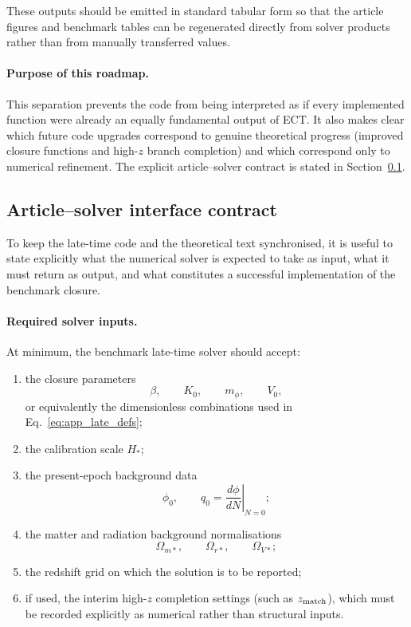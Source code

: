 \documentclass[11pt,a4paper]{article}
\numberwithin{equation}{section}
\begin{document}
These outputs should be emitted in standard tabular form so that the
article figures and benchmark tables can be regenerated directly from
solver products rather than from manually transferred values.

\paragraph{Purpose of this roadmap.}
This separation prevents the code from being interpreted as if every
implemented function were already an equally fundamental output of ECT.
It also makes clear which future code upgrades correspond to genuine
theoretical progress (improved closure functions and high-$z$ branch
completion) and which correspond only to numerical refinement.
The explicit article--solver contract is stated in
Section~\ref{sec:late_cosmo_interface}.

\subsection{Article--solver interface contract}
\label{sec:late_cosmo_interface}

To keep the late-time code and the theoretical text synchronised, it is
useful to state explicitly what the numerical solver is expected to take
as input, what it must return as output, and what constitutes a
successful implementation of the benchmark closure.

\paragraph{Required solver inputs.}
At minimum, the benchmark late-time solver should accept:
\begin{enumerate}
  \item the closure parameters
  \[
  \beta,\qquad K_0,\qquad m_\phi,\qquad V_0,
  \]
  or equivalently the dimensionless combinations used in
  Eq.~\eqref{eq:app_late_defs};
  \item the calibration scale $H_*$;
  \item the present-epoch background data
  \[
  \phi_0,\qquad q_0=\left.\frac{d\phi}{dN}\right|_{N=0};
  \]
  \item the matter and radiation background normalisations
  \[
  \Omega_{m*},\qquad \Omega_{r*},\qquad \Omega_{V*};
  \]
  \item the redshift grid on which the solution is to be reported;
  \item if used, the interim high-$z$ completion settings
  (such as $z_{\rm match}$), which must be recorded explicitly as
  numerical rather than structural inputs.
\end{enumerate}
\end{document}

